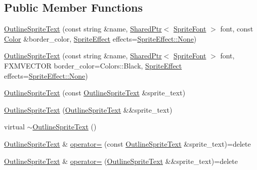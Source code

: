 \subsection*{Public Member Functions}
\begin{DoxyCompactItemize}
\item 
\hyperlink{classmage_1_1_outline_sprite_text_a20863727c984b3765c2282d1e50047ea}{Outline\+Sprite\+Text} (const string \&name, \hyperlink{namespacemage_a1e01ae66713838a7a67d30e44c67703e}{Shared\+Ptr}$<$ \hyperlink{classmage_1_1_sprite_font}{Sprite\+Font} $>$ font, const \hyperlink{structmage_1_1_color}{Color} \&border\+\_\+color, \hyperlink{namespacemage_a9cfe18123066ba4236f548f9de75d881}{Sprite\+Effect} effects=\hyperlink{namespacemage_a9cfe18123066ba4236f548f9de75d881a6adf97f83acf6453d4a6a4b1070f3754}{Sprite\+Effect\+::\+None})
\item 
\hyperlink{classmage_1_1_outline_sprite_text_a34b5ed735b82fbc9a68d9b9bfa6ebf41}{Outline\+Sprite\+Text} (const string \&name, \hyperlink{namespacemage_a1e01ae66713838a7a67d30e44c67703e}{Shared\+Ptr}$<$ \hyperlink{classmage_1_1_sprite_font}{Sprite\+Font} $>$ font, F\+X\+M\+V\+E\+C\+T\+OR border\+\_\+color=Colors\+::\+Black, \hyperlink{namespacemage_a9cfe18123066ba4236f548f9de75d881}{Sprite\+Effect} effects=\hyperlink{namespacemage_a9cfe18123066ba4236f548f9de75d881a6adf97f83acf6453d4a6a4b1070f3754}{Sprite\+Effect\+::\+None})
\item 
\hyperlink{classmage_1_1_outline_sprite_text_a15be7f23a00e893314b905d5385903c5}{Outline\+Sprite\+Text} (const \hyperlink{classmage_1_1_outline_sprite_text}{Outline\+Sprite\+Text} \&sprite\+\_\+text)
\item 
\hyperlink{classmage_1_1_outline_sprite_text_a86bb6e1637bcc71a4272f193466669e2}{Outline\+Sprite\+Text} (\hyperlink{classmage_1_1_outline_sprite_text}{Outline\+Sprite\+Text} \&\&sprite\+\_\+text)
\item 
virtual \hyperlink{classmage_1_1_outline_sprite_text_ae4d77ebb3f5bac4fd02b148d6173d10f}{$\sim$\+Outline\+Sprite\+Text} ()
\item 
\hyperlink{classmage_1_1_outline_sprite_text}{Outline\+Sprite\+Text} \& \hyperlink{classmage_1_1_outline_sprite_text_a324ec8e5c0d319b449895cc45d6b3807}{operator=} (const \hyperlink{classmage_1_1_outline_sprite_text}{Outline\+Sprite\+Text} \&sprite\+\_\+text)=delete
\item 
\hyperlink{classmage_1_1_outline_sprite_text}{Outline\+Sprite\+Text} \& \hyperlink{classmage_1_1_outline_sprite_text_a3549e97af5461728a399f01af9125486}{operator=} (\hyperlink{classmage_1_1_outline_sprite_text}{Outline\+Sprite\+Text} \&\&sprite\+\_\+text)=delete

\end{DoxyCompactItemize}
